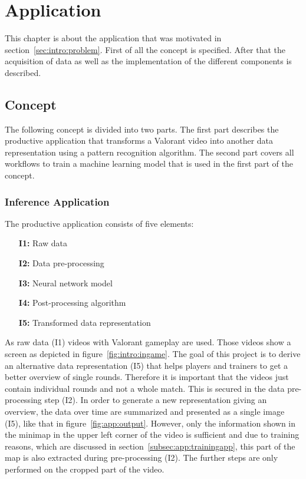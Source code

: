 \chapter{Application}\label{chpt:application}
\glsresetall

This chapter is about the application that was motivated in section~\ref{sec:intro:problem}. First of 
all the concept is specified. After that the acquisition of data as well as the implementation of the 
different components is described.

\section{Concept}\label{sec:app:concept}

The following concept is divided into two parts. The first part describes the productive application 
that transforms a Valorant video into another data representation using a pattern recognition 
algorithm. The second part covers all workflows to train a machine learning model that is used in the 
first part of the concept.

\subsection{Inference Application}\label{subsec:app:inference}

The productive application consists of five elements:

\begin{itemize}
	\item[\textbf{I1:}] Raw data
	\item[\textbf{I2:}] Data pre-processing
	\item[\textbf{I3:}] Neural network model
	\item[\textbf{I4:}] Post-processing algorithm
	\item[\textbf{I5:}] Transformed data representation
\end{itemize}

As raw data (I1) videos with Valorant gameplay are used. Those videos show a screen as depicted in 
figure~\ref{fig:intro:ingame}. The goal of this project is to derive an alternative data 
representation (I5) that helps players and trainers to get a better overview of single rounds. 
Therefore it is important that the videos just contain individual rounds and not a whole match. This is 
secured in the data pre-processing step (I2). In order to generate a new representation giving an 
overview, the data over time are summarized and presented as a single image (I5), like that in 
figure~\ref{fig:app:output}. However, only the information shown in the minimap in the upper left 
corner of the video is sufficient and due to training reasons, which are discussed in 
section~\ref{subsec:app:trainingapp}, this part of the map is also extracted during pre-processing 
(I2). The further steps are only performed on the cropped part of the video.

